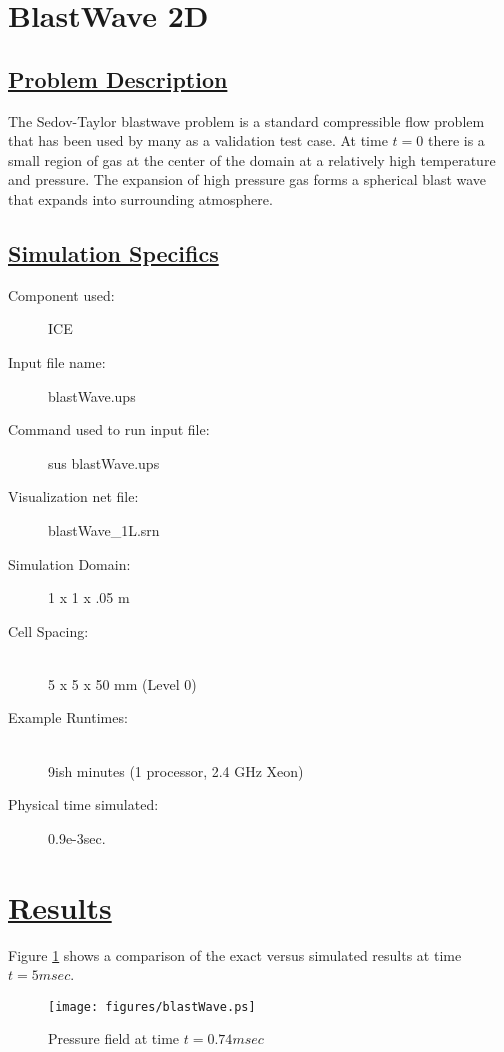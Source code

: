 \documentclass[fleqn]{article}
\begin{document}

\section*{\center BlastWave 2D}
\subsection*{\underline{Problem Description}}
The Sedov-Taylor blastwave problem is a standard compressible flow problem that has been used by many
as a validation test case.  At time $t=0$ there is a small region of gas at the center of the domain
at a relatively high temperature and pressure.  The expansion of high pressure gas forms a spherical
blast wave that expands into surrounding atmosphere.
\subsection*{\underline{Simulation Specifics}}
\begin{description} 
\item [Component used:] \hfill ICE
\item [Input file name:] \hfill blastWave.ups
\item [Command used to run input file:]\hfill sus blastWave.ups
\item [Visualization net file:]\hfill blastWave\_1L.srn\\


\item [Simulation Domain:]\hfill    1 x 1 x .05 m
\item [Cell Spacing:]\hfill \\ 
5 x 5 x 50 mm (Level 0)


\item [Example Runtimes:] \hfill \\
 9ish minutes   (1 processor, 2.4 GHz Xeon)

\item [Physical time simulated:] \hfill 0.9e-3sec.

\end{description}

\section*{\underline{Results}}
Figure \ref{results.BW} shows a comparison of the exact versus simulated results at time $t = 5msec$.
\begin{figure}
\texttt{[image: figures/blastWave.ps]}
\caption{Pressure field at time $t = 0.74msec$}
\label{results.BW}
\end{figure}
\newpage
\end{document}
